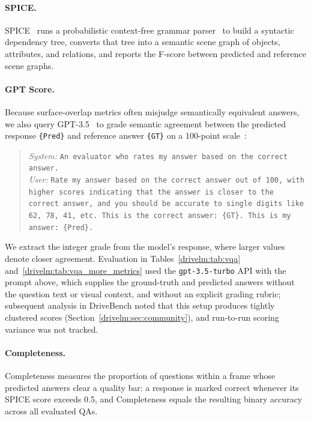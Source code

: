 \paragraph{SPICE.}
SPICE~\cite{anderson2016spice} runs a probabilistic context-free grammar parser~\cite{jelinek1992basic} to build a syntactic dependency tree, converts that tree into a semantic scene graph of objects, attributes, and relations, and reports the F-score between predicted and reference scene graphs.

\paragraph{GPT Score.}
Because surface-overlap metrics often misjudge semantically equivalent answers, we also query GPT-3.5~\cite{ouyang2022training,chatgpt} to grade semantic agreement between the predicted response \texttt{\{Pred\}} and reference answer \texttt{\{GT\}} on a 100-point scale~\cite{sima2024drivelm}:
\begin{quote}\small\raggedright
\textit{System:} \texttt{An evaluator who rates my answer based on the correct answer.}\\[2pt]
\textit{User:} \texttt{Rate my answer based on the correct answer out of 100, with higher scores indicating that the answer is closer to the correct answer, and you should be accurate to single digits like 62, 78, 41, etc. This is the correct answer: \{GT\}. This is my answer: \{Pred\}.}
\end{quote}
We extract the integer grade from the model's response, where larger values denote closer agreement. Evaluation in Tables~\ref{drivelm:tab:vqa} and~\ref{drivelm:tab:vqa_more_metrics} used the \texttt{gpt-3.5-turbo} API with the prompt above, which supplies the ground-truth and predicted answers without the question text or visual context, and without an explicit grading rubric; subsequent analysis in DriveBench noted that this setup produces tightly clustered scores (Section~\ref{drivelm:sec:community}), and run-to-run scoring variance was not tracked.

\paragraph{Completeness.}
Completeness measures the proportion of questions within a frame whose predicted answers clear a quality bar: a response is marked correct whenever its SPICE score exceeds 0.5, and Completeness equals the resulting binary accuracy across all evaluated QAs.

